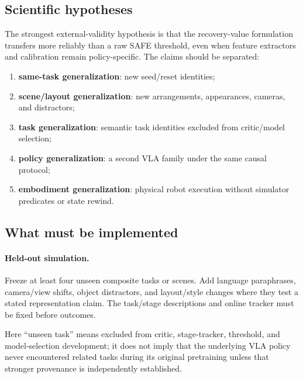
\subsection{Scientific hypotheses}

The strongest external-validity hypothesis is that the recovery-value formulation transfers more reliably than a raw SAFE threshold, even when feature extractors and calibration remain policy-specific. The claims should be separated:
\begin{enumerate}
  \item \textbf{same-task generalization}: new seed/reset identities;
  \item \textbf{scene/layout generalization}: new arrangements, appearances, cameras, and distractors;
  \item \textbf{task generalization}: semantic task identities excluded from critic/model selection;
  \item \textbf{policy generalization}: a second VLA family under the same causal protocol;
  \item \textbf{embodiment generalization}: physical robot execution without simulator predicates or state rewind.
\end{enumerate}

\subsection{What must be implemented}

\paragraph{Held-out simulation.}
Freeze at least four unseen composite tasks or scenes. Add language paraphrases, camera/view shifts, object distractors, and layout/style changes where they test a stated representation claim. The task/stage descriptions and online tracker must be fixed before outcomes.

Here ``unseen task'' means excluded from critic, stage-tracker, threshold, and model-selection development; it does not imply that the underlying VLA policy never encountered related tasks during its original pretraining unless that stronger provenance is independently established.

